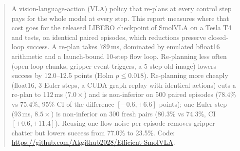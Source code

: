 \begin{abstract}
A vision-language-action (VLA) policy that re-plans at every control step pays for the whole model at every step.
This report measures where that cost goes for the released LIBERO checkpoint of SmolVLA on a Tesla T4 and tests, on identical paired episodes, which reductions preserve closed-loop success.
A re-plan takes 789\,ms, dominated by emulated bfloat16 arithmetic and a launch-bound 10-step flow loop.
Re-planning less often (open-loop chunks, gripper-event triggers, a 5-step-old image) lowers success by 12.0--12.5 points (Holm $p\le0.018$).
Re-planning more cheaply (float16, 3 Euler steps, a CUDA-graph replay with identical actions) cuts a re-plan to 112\,ms ($7.0\times$) and is non-inferior on 500 paired episodes (78.4\% vs 75.4\%, 95\% CI of the difference $[-0.6, +6.6]$ points); one Euler step (93\,ms, $8.5\times$) is non-inferior on 300 fresh pairs (80.3\% vs 74.3\%, CI $[+0.6, +11.4]$).
Reusing one flow noise per episode removes gripper chatter but lowers success from 77.0\% to 23.5\%.
Code: \url{https://github.com/Akgithub2028/Efficient-SmolVLA}.
\end{abstract}

